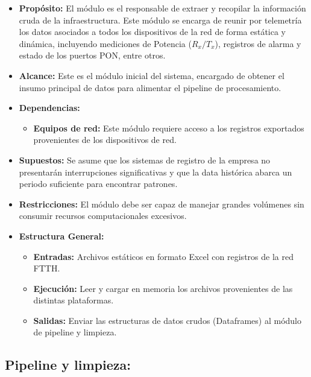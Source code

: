 \documentclass[12pt,a4paper]{article}
\begin{document}
    \begin{itemize}
        \item \textbf{Propósito:} El módulo es el responsable de extraer y recopilar la información cruda de la infraestructura. Este módulo se encarga de reunir por telemetría los datos asociados
        a todos los dispositivos de la red de forma estática y dinámica, incluyendo mediciones de Potencia ($R_x/T_x$), registros de alarma y estado de los puertos PON, entre otros. 

        \item \textbf{Alcance:} Este es el módulo inicial del sistema, encargado de obtener el insumo principal de datos para alimentar el pipeline de procesamiento. 
        
        \item \textbf{Dependencias:}
        
        \begin{itemize}
            \item \textbf{Equipos de red:} Este módulo requiere acceso a los registros exportados provenientes de los dispositivos de red.
        \end{itemize}

        \item \textbf{Supuestos:} Se asume que los sistemas de registro de la empresa no presentarán interrupciones significativas y que la data histórica abarca un periodo suficiente para encontrar patrones.
        \item \textbf{Restricciones:} El módulo debe ser capaz de manejar grandes volúmenes sin consumir recursos computacionales excesivos.
        \item \textbf{Estructura General:}
        \begin{itemize}
            \item \textbf{Entradas:} Archivos estáticos en formato Excel con registros de la red FTTH.
            \item \textbf{Ejecución:} Leer y cargar en memoria los archivos provenientes de las distintas plataformas.
            \item \textbf{Salidas:} Enviar las estructuras de datos crudos (Dataframes) al módulo de pipeline y limpieza.
        \end{itemize}
    \end{itemize}


    \subsection{Pipeline y limpieza:}
\end{document}
